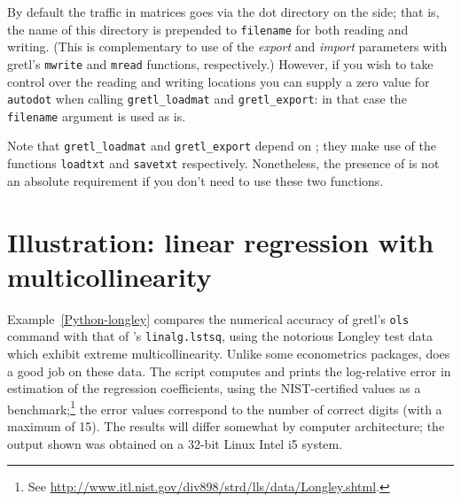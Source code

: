 By default the traffic in matrices goes via the dot directory on the
 side; that is, the name of this directory is prepended to
\texttt{filename} for both reading and writing. (This is complementary
to use of the \textsl{export} and \textsl{import} parameters with
gretl's \texttt{mwrite} and \texttt{mread} functions,
respectively.) However, if you wish to take control over the reading
and writing locations you can supply a zero value for
\texttt{autodot} when calling \verb|gretl_loadmat| and
\verb|gretl_export|: in that case the \texttt{filename} argument is
used as is.

Note that \verb|gretl_loadmat| and \verb|gretl_export| depend on
; they make use of the functions \texttt{loadtxt} and
\texttt{savetxt} respectively. Nonetheless, the presence of
 is not an absolute requirement if you don't need
to use these two functions.

\section{Illustration: linear regression with multicollinearity}
\label{sec:Python-longley}

Example~\ref{Python-longley} compares the numerical accuracy of
gretl's \texttt{ols} command with that of 's
\texttt{linalg.lstsq}, using the notorious Longley test data which
exhibit extreme multicollinearity.  Unlike some econometrics packages,
 does a good job on these data. The script computes and
prints the log-relative error in estimation of the regression
coefficients, using the NIST-certified values as a
benchmark;\footnote{See
  \url{http://www.itl.nist.gov/div898/strd/lls/data/Longley.shtml}.}
the error values correspond to the number of correct digits (with a
maximum of 15). The results will differ somewhat by computer
architecture; the output shown was obtained on a 32-bit Linux Intel i5
system.

